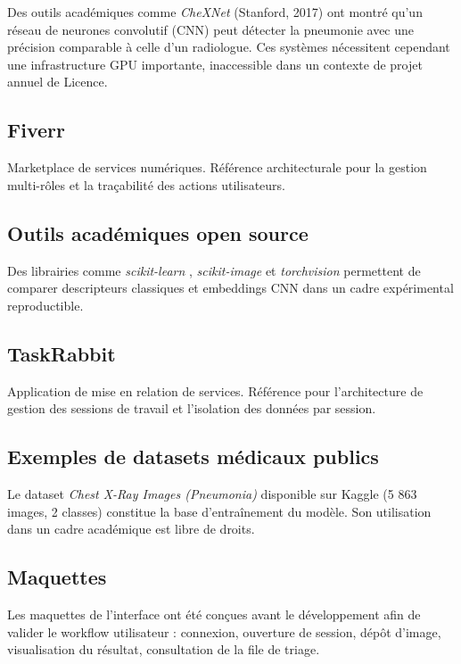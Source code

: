 \documentclass[12pt, a4paper]{report}
\begin{document}
Des outils académiques comme \textit{CheXNet} \cite{rajpurkar2017} (Stanford, 2017)
ont montré qu'un réseau de neurones convolutif (CNN) peut détecter la pneumonie
avec une précision comparable à celle d'un radiologue. Ces systèmes nécessitent
cependant une infrastructure GPU importante, inaccessible dans un contexte
de projet annuel de Licence.

\subsection{Fiverr}

Marketplace de services numériques. Référence architecturale pour la gestion
multi-rôles et la traçabilité des actions utilisateurs.

\subsection{Outils académiques open source}

Des librairies comme \textit{scikit-learn} \cite{scikit2011},
\textit{scikit-image} et \textit{torchvision} permettent de comparer
descripteurs classiques et embeddings CNN dans un cadre expérimental reproductible.

\subsection{TaskRabbit}

Application de mise en relation de services. Référence pour l'architecture
de gestion des sessions de travail et l'isolation des données par session.

\subsection{Exemples de datasets médicaux publics}

Le dataset \textit{Chest X-Ray Images (Pneumonia)} \cite{mooney2018} disponible
sur Kaggle (5 863 images, 2 classes) constitue la base d'entraînement du modèle.
Son utilisation dans un cadre académique est libre de droits.

\subsection{Maquettes}

Les maquettes de l'interface ont été conçues avant le développement afin de
valider le workflow utilisateur : connexion, ouverture de session, dépôt d'image,
visualisation du résultat, consultation de la file de triage.
\end{document}
